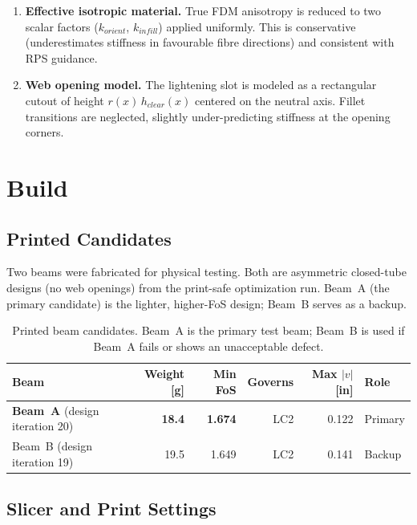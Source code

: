 \documentclass[11pt,letterpaper]{article}
\begin{document}
\begin{enumerate}
  \item \textbf{Effective isotropic material.}
    True FDM anisotropy is reduced to two scalar factors ($k_{orient}$,
    $k_{infill}$) applied uniformly.  This is conservative (underestimates
    stiffness in favourable fibre directions) and consistent with RPS guidance.

  \item \textbf{Web opening model.}
    The lightening slot is modeled as a rectangular cutout of height
    $r(x)\,h_{clear}(x)$ centered on the neutral axis.  Fillet transitions
    are neglected, slightly under-predicting stiffness at the opening corners.
\end{enumerate}


\section{Build}
\label{sec:build}

\subsection{Printed Candidates}

Two beams were fabricated for physical testing.  Both are asymmetric
closed-tube designs (no web openings) from the print-safe optimization run.
Beam~A (the primary candidate) is the lighter, higher-FoS design;
Beam~B serves as a backup.

\begin{table}[H]
\centering
\caption{Printed beam candidates.  Beam~A is the primary test beam;
Beam~B is used if Beam~A fails or shows an unacceptable defect.}
\label{tab:candidates}
\begin{tabular}{lrrrrl}
\toprule
Beam & Weight [g] & Min FoS & Governs & Max $|v|$ [in] & Role \\
\midrule
\textbf{Beam~A} (design iteration 20) & \textbf{18.4} & \textbf{1.674} & LC2 & 0.122 & Primary \\
Beam~B (design iteration 19)          & 19.5          & 1.649          & LC2 & 0.141 & Backup \\
\bottomrule
\end{tabular}
\end{table}

\subsection{Slicer and Print Settings}
\end{document}

